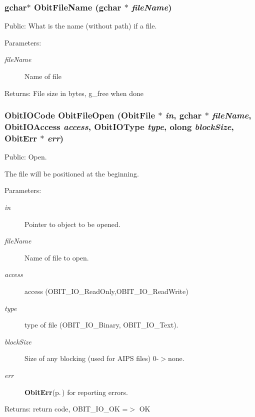 \subsubsection{\setlength{\rightskip}{0pt plus 5cm}gchar$\ast$ Obit\-File\-Name (gchar $\ast$ {\em file\-Name})}\label{ObitFile_8h_a42}


Public: What is the name (without path) if a file. 

\begin{Desc}
\item[Parameters:]
\begin{description}
\item[{\em file\-Name}]Name of file \end{description}
\end{Desc}
\begin{Desc}
\item[Returns:]File size in bytes, g\_\-free when done \end{Desc}
\subsubsection{\setlength{\rightskip}{0pt plus 5cm}Obit\-IOCode Obit\-File\-Open ({\bf Obit\-File} $\ast$ {\em in}, gchar $\ast$ {\em file\-Name}, Obit\-IOAccess {\em access}, Obit\-IOType {\em type}, {\bf olong} {\em block\-Size}, {\bf Obit\-Err} $\ast$ {\em err})}\label{ObitFile_8h_a29}


Public: Open. 

The file will be positioned at the beginning. \begin{Desc}
\item[Parameters:]
\begin{description}
\item[{\em in}]Pointer to object to be opened. \item[{\em file\-Name}]Name of file to open. \item[{\em access}]access (OBIT\_\-IO\_\-Read\-Only,OBIT\_\-IO\_\-Read\-Write) \item[{\em type}]type of file (OBIT\_\-IO\_\-Binary, OBIT\_\-IO\_\-Text). \item[{\em block\-Size}]Size of any blocking (used for AIPS files) 0-$>$none. \item[{\em err}]{\bf Obit\-Err}{\rm (p.\,\pageref{structObitErr})} for reporting errors. \end{description}
\end{Desc}
\begin{Desc}
\item[Returns:]return code, OBIT\_\-IO\_\-OK =$>$ OK \end{Desc}
